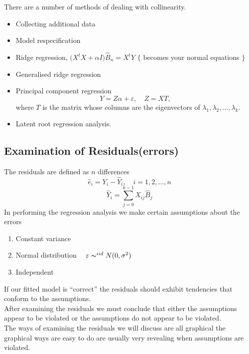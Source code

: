 \documentclass[11pt,a4paper]{article}
\theoremstyle{definition}
\begin{document}
There are a number of methods of dealing with collinearity.
\begin{itemize}
\item Collecting additional data
\item Model respecification
\item Ridge regression, $\big(X^tX+\alpha I\big)\widehat{B}_n=X^tY$ $\{$ becomes your normal equations $\}$
\item Generalised ridge regression
\item Principal component regression $$Y=Z\alpha + \varepsilon,\quad  Z=XT,$$ where $T$ is the matrix whose columns are the eigenvectors of $\lambda_1,\lambda_2,\ldots ,\lambda_k$.
\item Latent root regression analysis.\\
\end{itemize}


\subsection{Examination of Residuals(errors)}
The residuals are defined as $n$ differences $$\widehat{e}_i=Y_i-\widehat{Y}_i,\quad  i=1,2,\ldots ,n$$ 
$$\widehat{Y}_i=\sum^{k-1}_{j=0}X_{ij}\widehat{B}_j$$
In performing the regression analysis we make certain assumptions about the errors
\begin{enumerate}
\item Constant variance
\item Normal distribution  $\quad  \varepsilon \thicksim^{iid}N(0,\sigma^2)$
\item Independent 
\end{enumerate}

If our fitted model is ``correct'' the residuals should exhibit tendencies that conform to the assumptions.\\

After examining the residuals we must conclude that either the assumptions appear to be violated or the assumptions do not appear to be violated.\\

The ways of examining the residuals we will discuss are all graphical the graphical ways are easy to do are usually very revealing when assumptions are violated.\\
\end{document}
